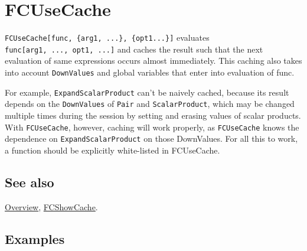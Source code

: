 \documentclass[../FeynCalcManual.tex]{subfiles}
\begin{document}
\hypertarget{fcusecache}{%
\section{FCUseCache}\label{fcusecache}}

\texttt{FCUseCache[\allowbreak{}func,\ \allowbreak{}\{\allowbreak{}arg1,\ \allowbreak{}...\},\ \allowbreak{}\{\allowbreak{}opt1...\}]}
evaluates
\texttt{func[\allowbreak{}arg1,\ \allowbreak{}...,\ \allowbreak{}opt1,\ \allowbreak{}...]}
and caches the result such that the next evaluation of same expressions
occurs almost immediately. This caching also takes into account
\texttt{DownValues} and global variables that enter into evaluation of
func.

For example, \texttt{ExpandScalarProduct} can't be naively cached,
because its result depends on the \texttt{DownValues} of \texttt{Pair}
and \texttt{ScalarProduct}, which may be changed multiple times during
the session by setting and erasing values of scalar products. With
\texttt{FCUseCache}, however, caching will work properly, as
\texttt{FCUseCache} knows the dependence on \texttt{ExpandScalarProduct}
on those DownValues. For all this to work, a function should be
explicitly white-listed in FCUseCache.

\subsection{See also}

\hyperlink{toc}{Overview}, \hyperlink{fcshowcache}{FCShowCache}.

\subsection{Examples}
\end{document}
